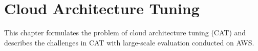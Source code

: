 \chapter{Cloud Architecture Tuning}
\label{chapter:cat}

This chapter formulates the problem of cloud architecture tuning (CAT) and describes the challenges in CAT with large-scale evaluation conducted on AWS.








%


